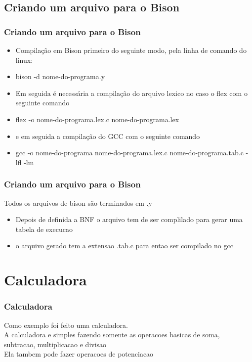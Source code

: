 \documentclass{beamer}
\begin{document}
\subsection{Criando um arquivo para o Bison}

\begin{frame}
\frametitle{Criando um arquivo para o Bison}
	\begin{itemize} 				%
	    \item<1->   Compilação em Bison primeiro do seguinte modo, pela linha de comando do linux:	%
	    \item<2-> bison -d nome-do-programa.y
	    \item<3-> Em seguida é necessária a compilação do arquivo lexico no caso o flex com o seguinte comando\:
	    \item<4-> flex -o nome-do-programa.lex.c nome-do-programa.lex
	    \item<5-> e em seguida a compilação do GCC com o seguinte comando 
	    \item<6-> gcc -o nome-do-programa nome-do-programa.lex.c nome-do-programa.tab.c -lfl -lm
    \end{itemize}
	

\end{frame}

\begin{frame}
\frametitle{Criando um arquivo para o Bison}
	Todos os arquivos de bison são terminados em .y
	\begin{itemize}
	\item<1-> Depois de definida a BNF o arquivo tem de ser complilado para gerar uma tabela de execucao
	\item<2-> o arquivo gerado tem a extensao .tab.c para entao ser compilado no gcc
	\end{itemize}  
\end{frame}
\section{Calculadora}

\begin{frame}
\frametitle{Calculadora}
	Como exemplo foi feito uma calculadora. \\
	A calculadora e simples fazendo somente as operacoes basicas de soma, subtracao, multiplicacao e divisao \\
	Ela tambem pode fazer operacoes de potenciacao
\end{frame}
\end{document}
